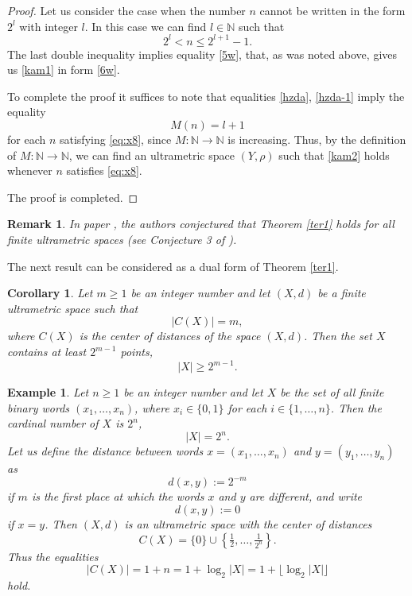 \documentclass[pdflatex,sn-mathphys-num]{sn-jnl}%
\theoremstyle{thmstyleone}%
\newtheorem{Corollary}[Theorem]{Corollary}
\theoremstyle{thmstyletwo}%
\newtheorem{Example}[Theorem]{Example}
\newtheorem{Remark}[Theorem]{Remark}
\theoremstyle{thmstylethree}%
\theoremstyle{thmstyletwo}%
\theoremstyle{thmstylethree}%
\begin{document}
\begin{proof}
Let us consider the case when the number $n$ cannot be written in the form $2^l$ with integer $l$. In this case we can find $l\in\mathbb{N}$ such that
\begin{equation}\label{eq:x8}
2^{l} < n \le 2^{l+1}-1.
\end{equation}
The last double inequality implies equality \eqref{5w}, that, as was noted above, gives us \eqref{kam1} in form \eqref{6w}.

To complete the proof it suffices to note that equalities \eqref{hzda}, \eqref{hzda-1} imply the equality 
\begin{equation*}
M(n)=l+1
\end{equation*}
for each $n$ satisfying \eqref{eq:x8}, since $M:\mathbb{N}\to\mathbb{N}$ is increasing. Thus, by the definition of $M:\mathbb{N}\to\mathbb{N}$, we can find an ultrametric space $(Y,\rho)$ such that \eqref{kam2} holds whenever $n$ satisfies \eqref{eq:x8}. 

The proof is completed.
\end{proof}


\begin{Remark}\label{yncx}
    In paper \cite{DR2026MDPI}, the authors conjectured that Theorem \ref{ter1} holds for all finite ultrametric spaces (see Conjecture 3 of \cite{DR2026MDPI}). 
\end{Remark}




The next result can be considered as a dual form of Theorem \ref{ter1}.

\begin{Corollary}\label{wsaasr} Let $m \ge 1$ be an integer number and let $(X,d)$ be a finite ultrametric space such that 
\[
|C(X)| = m,
\]
where $C(X)$ is the center of distances of the space $(X,d)$. Then the set $X$ contains at least $2^{m-1}$ points,
\[
|X| \ge 2^{m-1}.
\]
\end{Corollary}




\begin{Example}\label{exw2} Let $n \geq 1$ be an integer number and let $X$ be the set of all finite binary words $(x_1,\ldots,x_n)$, where $x_i \in \{0,1\}$ for each $i \in \{1,\ldots,n\}$. Then the cardinal number of $X$ is $2^n$, 
\[
|X| = 2^n.
\]
Let us define the distance between words $x=(x_1,\ldots,x_n)$ and $y=(y_1,\ldots,y_n)$ as
\[
d(x,y) := 2^{-m}
\]
if  $m$ is the first place at which the words $x$ and $y$ are different, and write
\[
d(x,y) := 0
\]
if $x=y$.
Then $(X,d)$ is an ultrametric space with the center of distances 
\[
C(X)=\{0\}\cup\left\{\tfrac12,\ldots,\tfrac1{2^n}\right\}.
\]
 Thus the equalities
\[
|C(X)| = 1+n = 1+\log_2 |X|=1+\lfloor \log_2|X| \rfloor
\]
hold.
\end{Example}
\end{document}
